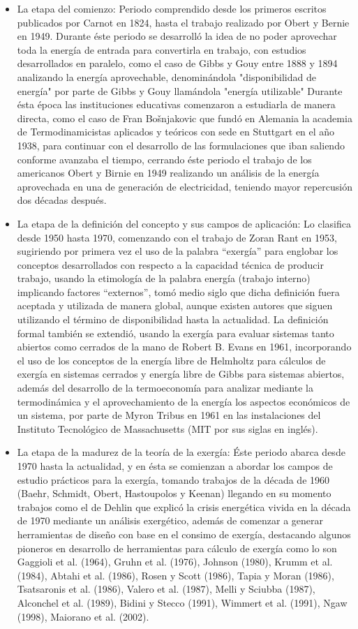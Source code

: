 \begin{itemize}
  \item La etapa del comienzo: Periodo comprendido desde los primeros escritos publicados por Carnot en 1824, hasta el trabajo realizado por Obert y Bernie en 1949. Durante éste periodo se desarrolló la idea de no poder aprovechar toda la energía de entrada para convertirla en trabajo, con estudios desarrollados en paralelo, como el caso de Gibbs y Gouy entre 1888 y 1894 analizando la energía aprovechable, denominándola "disponibilidad de energía" por parte de Gibbs y Gouy llamándola "energía utilizable" Durante ésta época las instituciones educativas comenzaron a estudiarla de manera directa, como el caso de Fran Bošnjakovic que fundó en Alemania la academia de Termodinamicistas aplicados y teóricos con sede en Stuttgart en el año 1938, para continuar con el desarrollo de las formulaciones que iban saliendo conforme avanzaba el tiempo, cerrando éste periodo el trabajo de los americanos Obert y Birnie en 1949 realizando un análisis de la energía aprovechada en una de generación de electricidad, teniendo mayor repercusión dos décadas después. 
  \item La etapa de la definición del concepto y sus campos de aplicación: Lo clasifica desde 1950 hasta 1970, comenzando con el trabajo de Zoran Rant en 1953, sugiriendo por primera vez el uso de la palabra ``exergía'' para englobar los conceptos desarrollados con respecto a la capacidad técnica de producir trabajo, usando la etimología de la palabra energía (trabajo interno) implicando factores ``externos'', tomó medio siglo que dicha definición fuera aceptada y utilizada de manera global, aunque existen autores que siguen utilizando el término de disponibilidad hasta la actualidad. La definición formal también se extendió, usando la exergía para evaluar sistemas tanto abiertos como cerrados de la mano de Robert B. Evans en 1961, incorporando el uso de los conceptos de la energía libre de Helmholtz para cálculos de exergía en sistemas cerrados y energía libre de Gibbs para sistemas abiertos, además del desarrollo de la termoeconomía para analizar mediante la termodinámica y el aprovechamiento de la energía los aspectos económicos de un sistema, por parte de Myron Tribus en 1961 en las instalaciones del Instituto Tecnológico de Massachusetts (MIT por sus siglas en inglés). 
  \item La etapa de la madurez de la teoría de la exergía: Éste periodo abarca desde 1970 hasta la actualidad, y en ésta se comienzan a abordar los campos de estudio prácticos para la exergía, tomando trabajos de la década de 1960 (Baehr, Schmidt, Obert, Hastoupolos y Keenan) llegando en su momento trabajos como el de Dehlin que explicó la crisis energética vivida en la década de 1970 mediante un análisis exergético, además de comenzar a generar herramientas de diseño con base en el consimo de exergía, destacando algunos pioneros en desarrollo de herramientas para cálculo de exergía como lo son Gaggioli et al. (1964), Gruhn et al. (1976), Johnson (1980), Krumm et al. (1984), Abtahi et al. (1986), Rosen y Scott (1986), Tapia y Moran (1986), Tsatsaronis et al. (1986), Valero et al. (1987), Melli y Sciubba (1987), Alconchel et al. (1989), Bidini y Stecco (1991), Wimmert et al. (1991), Ngaw (1998), Maiorano et al. (2002).

\end{itemize}
